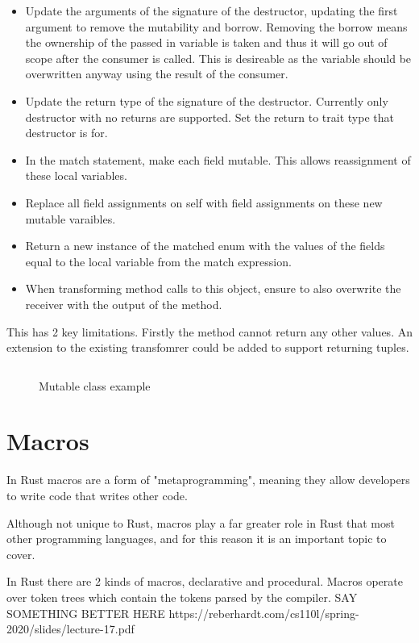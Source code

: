 \documentclass[ oneside,%
                    author={James Elgar},
                    degree={MEng},
                     title={Bidirectional transformer between functional and \\ object-oriented programming in Rust},
                  subtitle={}]{dissertation}
\newcommand{\codefile}[2]{\inputminted[xleftmargin=20pt,linenos, breaklines]{#1}{#2}}
\newcommand{\rustfile}[1]{\codefile{rust}{../#1.rs}}
\newcommand{\rustexample}[1]{\rustfile{examples/src/#1}}
\begin{document}
\begin{itemize}
    \item Update the arguments of the signature of the destructor, updating the first argument to remove the mutability and borrow. Removing the borrow means the ownership of the passed in variable is taken and thus it will go out of scope after the consumer is called. This is desireable as the variable should be overwritten anyway using the result of the consumer. 
    \item Update the return type of the signature of the destructor. Currently only destructor with no returns are supported. Set the return to trait type that destructor is for.
    \item In the match statement, make each field mutable. This allows reassignment of these local variables.
    \item Replace all field assignments on self with field assignments on these new mutable varaibles. 
    \item Return a new instance of the matched enum with the values of the fields equal to the local variable from the match expression. 
    \item When transforming method calls to this object, ensure to also overwrite the receiver with the output of the method.
\end{itemize}

This has 2 key limitations. Firstly the method cannot return any other values. An extension to the existing transfomrer could be added to support returning tuples.



\begin{figure}
\centering
\rustexample{mutable/oop-basic}
\caption{Mutable class example}
\label{fig:mutable-example}
\end{figure}

\section{Macros}

In Rust macros are a form of "metaprogramming", meaning they allow developers to write code that writes other code. 

Although not unique to Rust, macros play a far greater role in Rust that most other programming languages, and for this reason it is an important topic to cover. 

In Rust there are 2 kinds of macros, declarative and procedural. Macros operate over token trees which contain the tokens parsed by the compiler. SAY SOMETHING BETTER HERE  https://reberhardt.com/cs110l/spring-2020/slides/lecture-17.pdf
\end{document}
